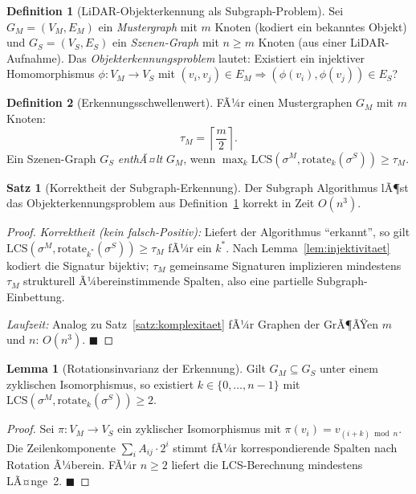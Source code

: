 ﻿\documentclass[a4paper,12pt]{article}
\theoremstyle{definition}
\newtheorem{definition}{Definition}[section]
\newtheorem{satz}{Satz}[section]
\newtheorem{lemma}{Lemma}[section]
\begin{document}
\begin{definition}[LiDAR-Objekterkennung als Subgraph-Problem]
  \label{def:erkennung}
  Sei $G_M = (V_M, E_M)$ ein \emph{Mustergraph} mit $m$ Knoten
  (kodiert ein bekanntes Objekt) und $G_S = (V_S, E_S)$ ein
  \emph{Szenen-Graph} mit $n \geq m$ Knoten (aus einer LiDAR-Aufnahme).
  Das \emph{Objekterkennungsproblem} lautet: Existiert ein injektiver
  Homomorphismus $\phi: V_M \to V_S$ mit
  $(v_i, v_j) \in E_M \Rightarrow (\phi(v_i), \phi(v_j)) \in E_S$?
\end{definition}

\begin{definition}[Erkennungsschwellenwert]
  \label{def:schwellenwert}
  FÃ¼r einen Mustergraphen $G_M$ mit $m$ Knoten:
  \[
    \tau_M = \left\lceil \frac{m}{2} \right\rceil.
  \]
  Ein Szenen-Graph $G_S$ \emph{enthÃ¤lt} $G_M$, wenn
  $\max_k \mathrm{LCS}(\sigma^M, \mathrm{rotate}_k(\sigma^S))
  \geq \tau_M$.
\end{definition}

\begin{satz}[Korrektheit der Subgraph-Erkennung]
  \label{satz:erkennung_korrektheit}
  Der Subgraph Algorithmus lÃ¶st das Objekterkennungsproblem aus
  Definition~\ref{def:erkennung} korrekt in Zeit $O(n^3)$.
\end{satz}

\begin{proof}
  \emph{Korrektheit (kein falsch-Positiv):} Liefert der Algorithmus
  ``erkannt'', so gilt $\mathrm{LCS}(\sigma^M, \mathrm{rotate}_{k^*}
  (\sigma^S)) \geq \tau_M$ fÃ¼r ein $k^*$. Nach
  Lemma~\ref{lem:injektivitaet} kodiert die Signatur bijektiv;
  $\tau_M$ gemeinsame Signaturen implizieren mindestens $\tau_M$
  strukturell Ã¼bereinstimmende Spalten, also eine partielle
  Subgraph-Einbettung.

  \emph{Laufzeit:} Analog zu Satz~\ref{satz:komplexitaet} fÃ¼r
  Graphen der GrÃ¶ÃŸen $m$ und $n$: $O(n^3)$. \hfill$\blacksquare$
\end{proof}

\begin{lemma}[Rotationsinvarianz der Erkennung]
  \label{lem:rotinvariant}
  Gilt $G_M \subseteq G_S$ unter einem zyklischen Isomorphismus,
  so existiert $k \in \{0,\ldots,n-1\}$ mit
  $\mathrm{LCS}(\sigma^M, \mathrm{rotate}_k(\sigma^S)) \geq 2$.
\end{lemma}

\begin{proof}
  Sei $\pi: V_M \to V_S$ ein zyklischer Isomorphismus mit
  $\pi(v_i) = v_{(i+k) \bmod n}$. Die Zeilenkomponente
  $\sum_i A_{ij} \cdot 2^i$ stimmt fÃ¼r korrespondierende Spalten
  nach Rotation Ã¼berein. FÃ¼r $n \geq 2$ liefert die LCS-Berechnung
  mindestens LÃ¤nge~2. \hfill$\blacksquare$
\end{proof}
\end{document}
